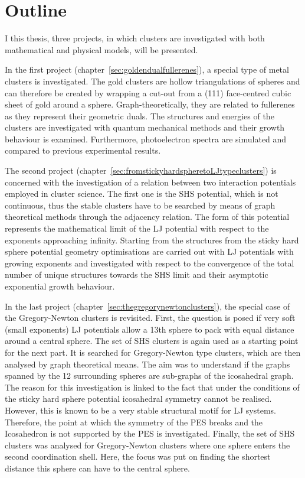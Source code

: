 \section{Outline}
\label{sec:Outline}

I this thesis, three projects, in which clusters are investigated with both
mathematical and physical models, will be presented.

In the first project (chapter~\ref{sec:goldendualfullerenes}), a special type of
metal clusters is investigated. The gold clusters are hollow triangulations of
spheres and can therefore be created by wrapping a cut-out from a (111)
face-centred cubic sheet of gold around a sphere. Graph-theoretically, they are
related to fullerenes as they represent their geometric duals. The structures
and energies of the clusters are investigated with quantum mechanical methods
and their growth behaviour is examined. Furthermore, photoelectron spectra are
simulated and compared to previous experimental results.

The second project (chapter~\ref{sec:fromstickyhardspheretoLJtypeclusters}) is
concerned with the investigation of a relation between two interaction
potentials employed in cluster science. The first one is the \ac{SHS} potential,
which is not continuous, thus the stable clusters have to be searched by means
of graph theoretical methods through the adjacency relation. The form of this
potential represents the mathematical limit of the \ac{LJ} potential with
respect to the exponents approaching infinity. Starting from the structures from
the sticky hard sphere potential geometry optimisations are carried out with
\ac{LJ} potentials with growing exponents and investigated with respect to the
convergence of the total number of unique structures towards the \ac{SHS} limit
and their asymptotic exponential growth behaviour.

In the last project (chapter~\ref{sec:thegregorynewtonclusters}), the special
case of the Gregory-Newton clusters is revisited. First, the question is posed
if very soft (small exponents) \ac{LJ} potentials allow a 13th sphere to pack
with equal distance around a central sphere. The set of \ac{SHS} clusters is
again used as a starting point for the next part. It is searched for
Gregory-Newton type clusters, which are then analysed by graph theoretical
means. The aim was to understand if the graphs spanned by the 12 surrounding
spheres are sub-graphs of the icosahedral graph. The reason for this
investigation is linked to the fact that under the conditions of the sticky hard
sphere potential icosahedral symmetry cannot be realised. However, this is known
to be a very stable structural motif for \ac{LJ} systems. Therefore, the point
at which the symmetry of the \ac{PES} breaks and the Icosahedron is not
supported by the \ac{PES} is investigated. Finally, the set of \ac{SHS} clusters
was analysed for Gregory-Newton clusters where one sphere enters the second
coordination shell. Here, the focus was put on finding the shortest distance
this sphere can have to the central sphere.



